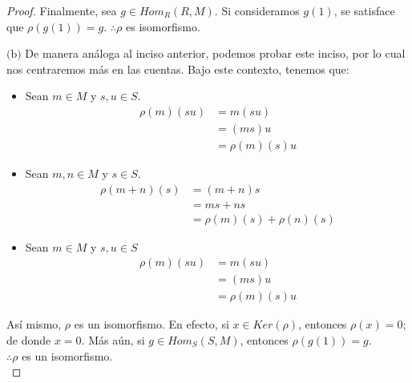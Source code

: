 \documentclass{article}
\newcommand{\lrprth}[1]{
	\left(#1\right)
}
\newcommand{\ringmodhom}[3]{
	Hom_{#1}\lrprth{#2,#3}
}
\theoremstyle{definition}
\theoremstyle{plain}
\theoremstyle{plain}
\theoremstyle{definition}
\theoremstyle{definition}
\theoremstyle{definition}
\theoremstyle{definition}
\theoremstyle{definition}
\theoremstyle{definition}
\begin{document}
\begin{enumerate}[label=\textbf{Ej \arabic*.}]
\begin{proof}
	Finalmente, sea $g \in \ringmodhom{R}{R}{M}$. Si consideramos $g\lrprth{1}$, se satisface que $\rho \lrprth{g\lrprth{1}}=g$. $\therefore\rho$ es isomorfismo.
	
	$\boxed{\text{(b)}}$ De manera análoga al inciso anterior, podemos probar este inciso, por lo cual nos centraremos más en las cuentas. Bajo este contexto, tenemos que:
	\begin{itemize}
		\item Sean $m \in M$ y $s,u \in S$.
		\begin{align*}
			\rho\lrprth{m}\lrprth{su}&=m\lrprth{su}\\
			&=\lrprth{ms}u\\
			&=\rho\lrprth{m}\lrprth{s}u
		\end{align*}
		\item Sean $m,n \in M$ y $s \in S$.
		\begin{align*}
			\rho\lrprth{m+n}\lrprth{s}&=\lrprth{m+n}s\\
			&=ms+ns\\
			&=\rho\lrprth{m}\lrprth{s}+\rho\lrprth{n}\lrprth{s}
		\end{align*}
		\item Sean $m \in M$ y $s,u \in S$
		\begin{align*}
			\rho\lrprth{m}\lrprth{su}&=m\lrprth{su}\\
			&=\lrprth{ms}u\\
			&=\rho\lrprth{m}\lrprth{s}u
		\end{align*}
	\end{itemize}
	
	Así mismo, $\rho$ es un isomorfismo. En efecto, si $x \in Ker\lrprth{ \rho }$, entonces $\rho \lrprth{x}=0$; de donde $x=0$. Más aún, si $g \in \ringmodhom{S}{S}{M}$, entonces $\rho \lrprth{g\lrprth{1}}=g$.\\
	$\therefore\rho$ es un isomorfismo.\\
\end{proof}


\end{enumerate}
\end{document}
